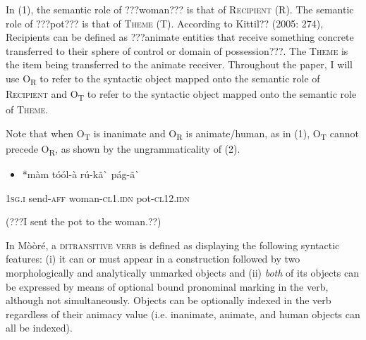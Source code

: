 \documentclass[output=paper]{langsci/langscibook}
\begin{document}
In (1), the semantic role of ???woman??? is that of \textsc{Recipient} (R).  The semantic role of ???pot??? is that of \textsc{Theme} (T). According to Kittil?? (2005: 274), Recipients can be defined as ???animate entities that receive something concrete transferred to their sphere of control or domain of possession???. The \textsc{Theme} is the item being transferred to the animate receiver. Throughout the paper, I will use O\textsubscript{R} to refer to the syntactic object mapped onto the semantic role of \textsc{Recipient} and O\textsubscript{T }to refer to the syntactic object mapped onto the semantic role of \textsc{Theme}. 

Note that when O\textsubscript{T} is inanimate and O\textsubscript{R} is animate/human, as in (1), O\textsubscript{T} cannot precede O\textsubscript{R}, as shown by the ungrammaticality of (2).

\begin{itemize}
\item \begin{styleNumberedEX}
\label{bkm:Ref444692191}*m\`{a}m  t\'{o}\'{o}l-\`{a}    r\'{u}-k\~{a}\`{ }      p\'{a}g-\~{a}\`{ }
\end{styleNumberedEX}\end{itemize}
\begin{styleGloss}
\textsc{1sg.i}    send-\textsc{aff}  woman-\textsc{cl1.idn}  pot-\textsc{cl12.idn}
\end{styleGloss}

\begin{styleTranslation}
(???I sent the pot to the woman.??)
\end{styleTranslation}

In M\`{o}\`{o}r\'{e}, a \textsc{ditransitive verb} is defined as displaying the following syntactic features: (i) it can or must appear in a construction followed by two morphologically and analytically unmarked objects and (ii) \textit{both} of its objects can be expressed by means of optional bound pronominal marking in the verb, although not simultaneously. Objects can be optionally indexed in the verb regardless of their animacy value (i.e. inanimate, animate, and human objects can all be indexed).
\end{document}
